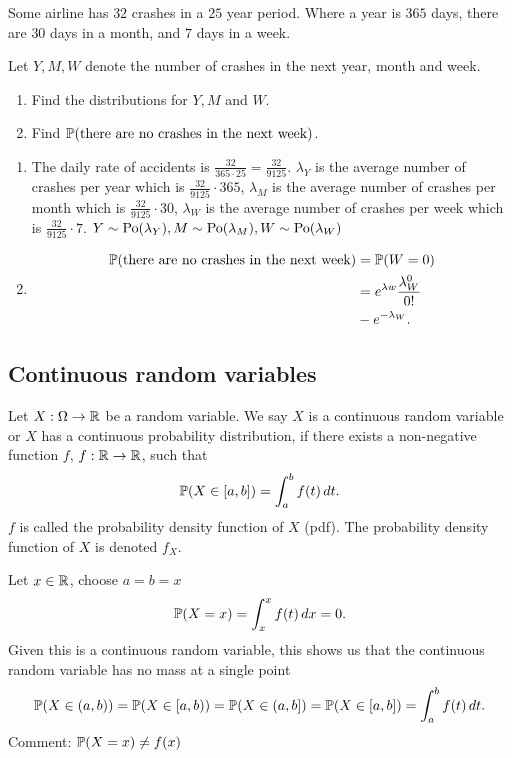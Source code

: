 \documentclass[10pt, a4paper]{article}
\begin{document}
\begin{example}
    Some airline has $32$ crashes in a $25$ year period.
    Where a year is $365$ days,
    there are $30$ days in a month,
    and $7$ days in a week.

    Let $Y, M, W$ denote the number of crashes in the next year,
    month
    and week.
    \begin{enumerate}[label = (\alph*)]
        \item Find the distributions for $Y, M$ and $W$.
        \item Find $\P(\text{there are no crashes in the next week})$.
    \end{enumerate}
    \begin{enumerate}[label = (\alph*)]
        \item 
        The daily rate of accidents is $\frac{32}{365 \cdot 25} = \frac{32}{9125}$.
        $\lambda_Y$ is the average number of crashes per year which is $\frac{32}{9125} \cdot 365$,
        $\lambda_M$ is the average number of crashes per month which is $\frac{32}{9125} \cdot 30$,
        $\lambda_W$ is the average number of crashes per week which is $\frac{32}{9125} \cdot 7$.
        $Y \sim \Po(\lambda_Y), M \sim \Po(\lambda_M), W \sim \Po(\lambda_W)$
        \item
        \begin{align*}
            \P(\text{there are no crashes in the next week}) &= \P(W = 0) \\
            &= e ^ {\lambda w}\frac{\lambda_W ^ 0}{0!} \\
            &- e ^ {-\lambda_W}.
        \end{align*}
    \end{enumerate}
\end{example}

\subsection{Continuous random variables}
\begin{definition}
    Let $X : \Omega \rightarrow \R$ be a random variable.
    We say $X$ is a continuous random variable or $X$ has a continuous probability distribution,
    if there exists a non-negative function $f$,
    $f : \R \rightarrow \R$,
    such that
    \[
    \P(X \in [a, b]) = \int_a^bf(t)\,dt.
    \]
    $f$ is called the probability density function of $X$ (pdf).
    The probability density function of $X$ is denoted $f_X$.
\end{definition}
Let $x \in \R$,
choose $a = b = x$
\[
\P(X = x) = \int_x^xf(t)\,dx = 0.
\]
Given this is a continuous random variable,
this shows us that the continuous random variable has no mass at a single point
\[
\P(X \in (a, b)) = \P(X \in [a, b)) = \P(X \in (a, b]) = \P(X \in [a, b]) = \int_a^bf(t)\,dt.
\]
Comment: $\P(X = x) \neq f(x)$
\end{document}
